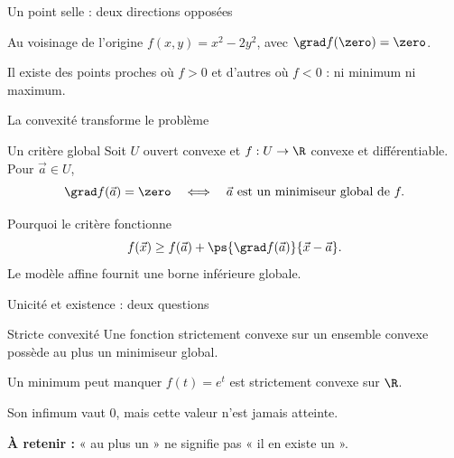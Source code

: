 \begin{frame}[t]{Un point selle : deux directions opposées}
\coursanalyse
\begin{exemple}{Au voisinage de l’origine}
$f(x,y)=x^2-2y^2$, avec $\grad f(\zero)=\zero$.
\end{exemple}
\begin{center}\end{center}
Il existe des points proches où $f>0$ et d’autres où $f<0$ : ni minimum ni maximum.
\end{frame}

\begin{frame}[t]{La convexité transforme le problème}
\coursanalyse
\begin{theoreme}{Un critère global}
Soit $U$ ouvert convexe et $f:U\to\R$ convexe et différentiable. Pour $\vec a\in U$,
\[\grad f(\vec a)=\zero\quad\Longleftrightarrow\quad\vec a\text{ est un minimiseur global de }f.\]
\end{theoreme}
\begin{resultat}{Pourquoi le critère fonctionne}
\[f(\vec x)\ge f(\vec a)+\ps{\grad f(\vec a)}{\vec x-\vec a}.\]
Le modèle affine fournit une borne inférieure globale.
\end{resultat}
\end{frame}

\begin{frame}[t]{Unicité et existence : deux questions}
\coursanalyse
\begin{theoreme}{Stricte convexité}
Une fonction strictement convexe sur un ensemble convexe possède au plus un minimiseur global.
\end{theoreme}
\begin{exemple}{Un minimum peut manquer}
$f(t)=e^t$ est strictement convexe sur $\R$.
\par Son infimum vaut $0$, mais cette valeur n’est jamais atteinte.
\end{exemple}\vfill\textbf{À retenir :} « au plus un » ne signifie pas « il en existe un ».
\end{frame}

